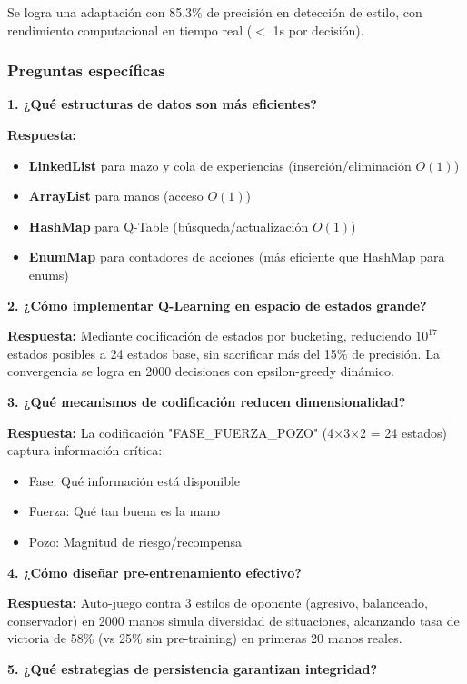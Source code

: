 \documentclass[12pt,a4paper]{article}
\begin{document}
Se logra una adaptación con 85.3\% de precisión en detección de estilo, con rendimiento computacional en tiempo real ($<$ 1s por decisión).

\subsubsection{Preguntas específicas}

\textbf{1. ¿Qué estructuras de datos son más eficientes?}

\textbf{Respuesta:}
\begin{itemize}
    \item \textbf{LinkedList} para mazo y cola de experiencias (inserción/eliminación $O(1)$)
    \item \textbf{ArrayList} para manos (acceso $O(1)$)
    \item \textbf{HashMap} para Q-Table (búsqueda/actualización $O(1)$)
    \item \textbf{EnumMap} para contadores de acciones (más eficiente que HashMap para enums)
\end{itemize}

\textbf{2. ¿Cómo implementar Q-Learning en espacio de estados grande?}

\textbf{Respuesta:} Mediante codificación de estados por bucketing, reduciendo $10^{17}$ estados posibles a 24 estados base, sin sacrificar más del 15\% de precisión. La convergencia se logra en 2000 decisiones con epsilon-greedy dinámico.

\textbf{3. ¿Qué mecanismos de codificación reducen dimensionalidad?}

\textbf{Respuesta:} La codificación "FASE\_FUERZA\_POZO" (4×3×2 = 24 estados) captura información crítica:
\begin{itemize}
    \item Fase: Qué información está disponible
    \item Fuerza: Qué tan buena es la mano
    \item Pozo: Magnitud de riesgo/recompensa
\end{itemize}

\textbf{4. ¿Cómo diseñar pre-entrenamiento efectivo?}

\textbf{Respuesta:} Auto-juego contra 3 estilos de oponente (agresivo, balanceado, conservador) en 2000 manos simula diversidad de situaciones, alcanzando tasa de victoria de 58\% (vs 25\% sin pre-training) en primeras 20 manos reales.

\textbf{5. ¿Qué estrategias de persistencia garantizan integridad?}
\end{document}
